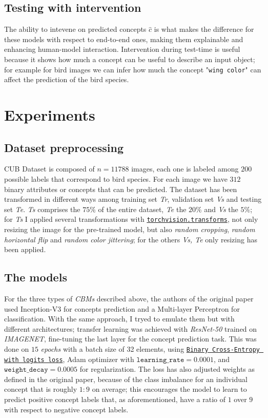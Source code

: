 \documentclass[10pt, twocolumn, letterpaper]{article}
\begin{document}
\subsection{Testing with intervention}
The ability to intevene on predicted concepts $\hat{c}$ is what makes the difference for these models with respect to end-to-end ones, 
making them explainable and enhancing human-model interaction. Intervention during test-time is useful because it shows how much a concept can be useful to describe an input object; for example for bird images we can infer how much the concept "\texttt{wing color}" can affect the prediction of the bird species.

\section{Experiments}
\subsection{Dataset preprocessing}
CUB Dataset \cite{wah2011caltech} is composed of $n=11788$ images, each one is labeled among $200$ possible labels that correspond to bird species. For each image we have $312$ binary attributes or concepts that can be predicted. The dataset has been transformed in different ways among training set \textit{Tr}, validation set \textit{Vs} and testing set \textit{Te}. 
\textit{Ts} comprises the $75\%$ of the entire dataset, \textit{Te} the $20\%$ and \textit{Vs} the $5\%$; 
for \textit{Ts} I applied several transformations with \href{https://pytorch.org/vision/0.9/transforms.html}{\texttt{torchvision.transforms}}, not only resizing the image for the pre-trained model, but also \textit{random cropping}, \textit{random horizontal flip} and \textit{random color jittering}; for the others \textit{Vs, Te} only resizing has been applied.
\subsection{The models}
For the three types of \textit{CBMs} described above, the authors of the original paper used Inception-V3 \cite{szegedy2016rethinking} for concepts prediction and a Multi-layer Perceptron for classification. 
With the same approach, I tryed to emulate them but with different architectures; transfer learning was achieved with \textit{ResNet-50} \cite{he2016deep} trained on \textit{IMAGENET}, fine-tuning the last layer for the concept prediction task. This was done on $15$ \textit{epochs} with a batch size of 32 elements, using \href{https://pytorch.org/docs/stable/generated/torch.nn.BCEWithLogitsLoss.html}{\texttt{Binary Cross-Entropy with logits loss}}, Adam \cite{kingma2014adam} optimizer with $\texttt{learning\_rate} = 0.0001$, and $\texttt{weight\_decay} = 0.0005$ for regularization. The loss has also adjusted weights as defined in the original paper, because of the class imbalance for an individual concept that is roughly $1 : 9$ on average; this encourages the model to learn to predict positive concept labels that, as aforementioned, have a ratio of $1$ over $9$ with respect to negative concept labels.
\end{document}
